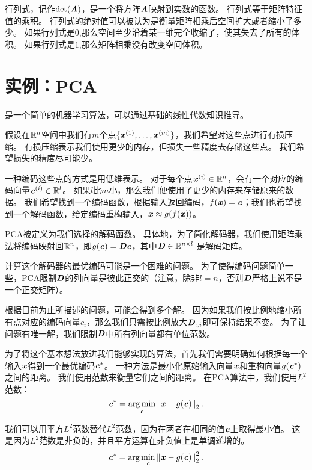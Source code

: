 行列式，记作$\text{det}(\boldsymbol{\mathit{A}})$，是一个将方阵$\boldsymbol{\mathit{A}}$映射到实数的函数。
行列式等于矩阵特征值的乘积。
行列式的绝对值可以被认为是衡量矩阵相乘后空间扩大或者缩小了多少。
如果行列式是$0$,那么空间至少沿着某一维完全收缩了，使其失去了所有的体积。
如果行列式是$1$,那么矩阵相乘没有改变空间体积。




\section{实例：\gls{PCA}}
\label{sec:principal_components_analysis}

是一个简单的机器学习算法，可以通过基础的线性代数知识推导。


假设在$\mathbb{R}^n$空间中我们有$m$个点$\{\boldsymbol{\mathit{x}}^{(1)}, \dots ,\boldsymbol{\mathit{x}}^{(m)}\}$，我们希望对这些点进行有损压缩。
有损压缩表示我们使用更少的内存，但损失一些精度去存储这些点。
我们希望损失的精度尽可能少。


一种编码这些点的方式是用低维表示。
对于每个点$\boldsymbol{\mathit{x}}^{(i)} \in \mathbb{R}^n$，会有一个对应的编码向量$\boldsymbol{\mathit{c}}^{(i)}\in \mathbb{R}^l$。
如果$l$比$m$小，那么我们便使用了更少的内存来存储原来的数据。
我们希望找到一个编码函数，根据输入返回编码，$f(\boldsymbol{\mathit{x}})=\boldsymbol{\mathit{c}}$；我们也希望找到一个解码函数，给定编码重构输入，$\boldsymbol{\mathit{x}}\approx g(f(\boldsymbol{\mathit{x}}))$。


\gls{PCA}被定义为我们选择的解码函数。
具体地，为了简化解码器，我们使用矩阵乘法将编码映射回$\mathbb{R}^n$，即$g(\boldsymbol{\mathit{c}})=\boldsymbol{\mathit{D}}\boldsymbol{\mathit{c}}$，其中$\boldsymbol{\mathit{D}}\in \mathbb{R}^{n\times l}$ 是解码矩阵。



计算这个解码器的最优编码可能是一个困难的问题。
为了使得编码问题简单一些，PCA限制$\boldsymbol{\mathit{D}}$的列向量是彼此正交的（注意，除非$l=n$，否则$\boldsymbol{\mathit{D}}$严格上说不是一个正交矩阵）。


根据目前为止所描述的问题，可能会得到多个解。
因为如果我们按比例地缩小所有点对应的编码向量$c_i$，那么我们只需按比例放大$\boldsymbol{\mathit{D}}_{:,i}$即可保持结果不变。
为了让问题有唯一解，我们限制$\boldsymbol{\mathit{D}}$中所有列向量都有单位范数。


为了将这个基本想法放进我们能够实现的算法，首先我们需要明确如何根据每一个输入$\boldsymbol{\mathit{x}}$得到一个最优编码$\boldsymbol{\mathit{c}}^*$。
一种方法是最小化原始输入向量$\boldsymbol{\mathit{x}}$和重构向量$g(\boldsymbol{\mathit{c}}^*)$之间的距离。
我们使用范数来衡量它们之间的距离。
在PCA算法中，我们使用$L^2$范数：
\begin{equation}
\label{eq:2.52}
\Vc^* = \underset{\Vc}{\arg\min} \norm{x-g(\Vc)}_2.
\end{equation}


我们可以用平方$L^2$范数替代$L^2$范数，因为在两者在相同的值$\boldsymbol{\mathit{c}}$上取得最小值。
这是因为$L^2$范数是非负的，并且平方运算在非负值上是单调递增的。
\begin{equation}
\boldsymbol{\mathit{c}}^* = \arg\min_{\boldsymbol{\mathit{c}}} \left\lVert\boldsymbol{\mathit{x}} - g(\boldsymbol{\mathit{c}})\right\rVert_2^2.
\end{equation}


